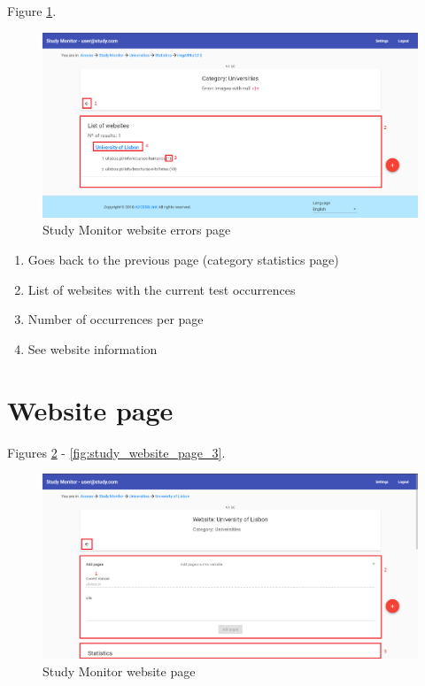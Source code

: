 Figure \ref{fig:study_website_errors_page}.

\begin{figure}[H]
    \centering
    \includegraphics[width=\linewidth]{lib/images/study/study_website_errors_page.png}
    \caption{Study Monitor website errors page}
    \label{fig:study_website_errors_page}
\end{figure}

\begin{enumerate}
    \item Goes back to the previous page (category statistics page)
    \item List of websites with the current test occurrences
    \item Number of occurrences per page
    \item See website information
\end{enumerate}

\section{Website page}

Figures \ref{fig:study_website_page} - \ref{fig:study_website_page_3}.

\begin{figure}[H]
    \centering
    \includegraphics[width=\linewidth]{lib/images/study/study_website_page.png}
    \caption{Study Monitor website page}
    \label{fig:study_website_page}
\end{figure}

